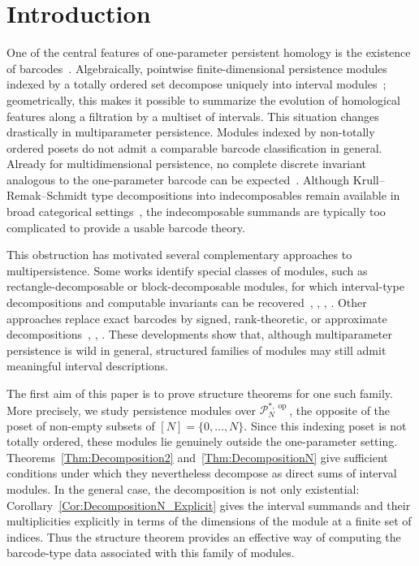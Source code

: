 \documentclass[reqno,12pt]{amsart}
\newcommand{\cP}{\mathcal{P}}
\DeclareMathOperator{\op}{op}
\newcommand{\0}{\mathbf 0}
\theoremstyle{definition}
\begin{document}
\maketitle


\section{Introduction}

One of the central features of one-parameter persistent homology is the existence of barcodes~\cite{Carlsson_Zomorodian05}. Algebraically, pointwise finite-dimensional persistence modules indexed by a totally ordered set decompose uniquely into interval modules~\cite{CrawleyBoevey15}; geometrically, this makes it possible to summarize the evolution of homological features along a filtration by a multiset of intervals. This situation changes drastically in multiparameter persistence. Modules indexed by non-totally ordered posets do not admit a comparable barcode classification in general. Already for multidimensional persistence, no complete discrete invariant analogous to the one-parameter barcode can be expected~\cite{Carlsson_Zomorodian09}. Although Krull--Remak--Schmidt type decompositions into indecomposables remain available in broad categorical settings~\cite{Bakke_Crawley20}, the indecomposable summands are typically too complicated to provide a usable barcode theory.

This obstruction has motivated several complementary approaches to multipersistence. Some works identify special classes of modules, such as rectangle-decomposable or block-decomposable modules, for which interval-type decompositions and computable invariants can be recovered~\cite{Bjerkevik21}, \cite{Botnan_Lebovici_Oudot22}, \cite{Bakke_Crawley20}, \cite{Lebovici_Lerch_Oudot24}. Other approaches replace exact barcodes by signed, rank-theoretic, or approximate decompositions~\cite{Bjerkevik25}, \cite{Botnan_Oppermann_Oudot25}, \cite{Botnan_Oppermann_Oudot_Scoccola24}. These developments show that, although multiparameter persistence is wild in general, structured families of modules may still admit meaningful interval descriptions.

The first aim of this paper is to prove structure theorems for one such family. More precisely, we study persistence modules over $\cP_N^{*,\op}$, the opposite of the poset of non-empty subsets of $[N]=\{0,\dots,N\}$. Since this indexing poset is not totally ordered, these modules lie genuinely outside the one-parameter setting. Theorems~\ref{Thm:Decomposition2} and~\ref{Thm:DecompositionN} give sufficient conditions under which they nevertheless decompose as direct sums of interval modules. In the general case, the decomposition is not only existential: Corollary~\ref{Cor:DecompositionN_Explicit} gives the interval summands and their multiplicities explicitly in terms of the dimensions of the module at a finite set of indices. Thus the structure theorem provides an effective way of computing the barcode-type data associated with this family of modules. 
\end{document}
